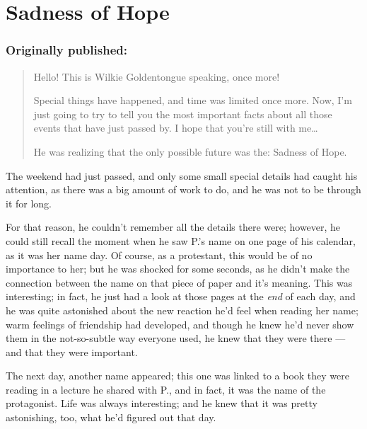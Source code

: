 \chapter{Sadness of Hope}
\label{cha:sadness-of-hope}
\subsection*{Originally published: }
\begin{quote}
Hello! This is Wilkie Goldentongue speaking, once more!

Special things have happened, and time was limited once more. Now, I'm just going to try to tell you the most important facts about all those events that have just passed by. I hope that you're still with me\ldots

He was realizing that the only possible future was the: Sadness of Hope.
\end{quote}

The weekend had just passed, and only some small special details had caught his attention, as there was a big amount of work to do, and he was not to be through it for long.

For that reason, he couldn't remember all the details there were; however, he could still recall the moment when he saw P.'s name on one page of his calendar, as it was her name day. Of course, as a protestant, this would be of no importance to her; but he was shocked for some seconds, as he didn't make the connection between the name on that piece of paper and it's meaning. This was interesting; in fact, he just had a look at those pages at the \emph{end} of each day, and he was quite astonished about the new reaction he'd feel when reading her name; warm feelings of friendship had developed, and though he knew he'd never show them in the not-so-subtle way everyone used, he knew that they were there --- and that they were important.

The next day, another name appeared; this one was linked to a book they were reading in a lecture he shared with P., and in fact, it was the name of the protagonist. 
Life was always interesting; and he knew that it was pretty astonishing, too, what he'd figured out that day.

